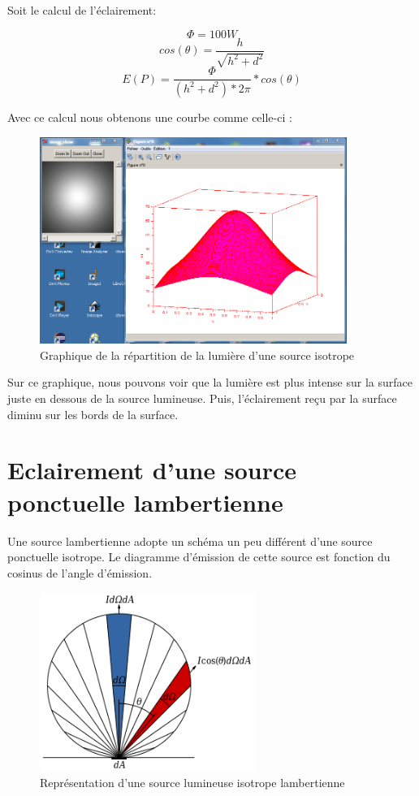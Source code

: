 \documentclass[a4paper,11pt]{article}
\begin{document}
  Soit le calcul de l'éclairement:
  
  $$ \Phi = 100 W $$
  $$ cos(\theta) = \frac{h}{\sqrt{h^{2}+d^{2}}} $$
  $$ E(P)=\frac{\Phi}{(h^{2}+d^{2})*2\pi}*cos(\theta) $$
  
  Avec ce calcul nous obtenons une courbe comme celle-ci :
  
  \begin{figure}[H]
    \center
    \includegraphics[width=10cm]{../isotrope.PNG}
    \caption{Graphique de la répartition de la lumière d'une source isotrope}
  \end{figure}
  
  Sur ce graphique, nous pouvons voir que la lumière est plus intense sur la surface juste
  en dessous de la source lumineuse. Puis, l'éclairement reçu par la surface diminu sur les 
  bords de la surface.

  \section{Eclairement d'une source ponctuelle lambertienne}
  Une source lambertienne adopte un schéma un peu différent d'une source ponctuelle isotrope.
  Le diagramme d'émission de cette source est fonction du cosinus de l'angle d'émission.
  
  \begin{figure}[H]
    \center
    \includegraphics[width=7cm]{../Lambert_Cosine_Law_1.png}
    \caption{Représentation d'une source lumineuse isotrope lambertienne}
  \end{figure}
  
\end{document}
